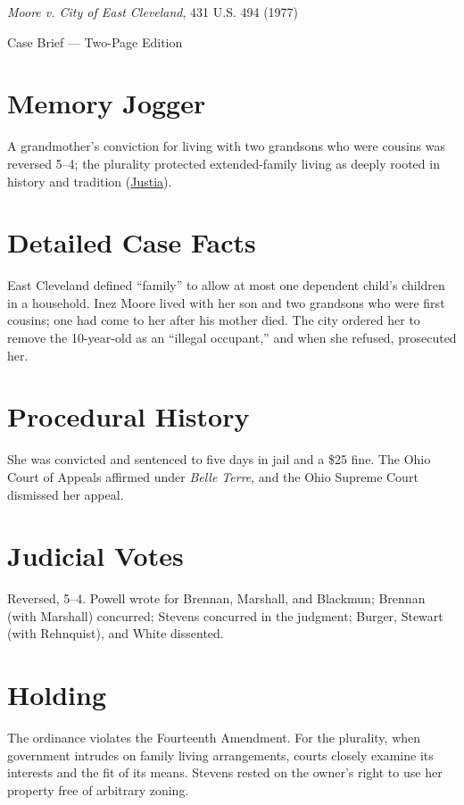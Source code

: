 \documentclass[12pt]{article}
\begin{document}
\begin{center}
{\LARGE \textit{Moore v. City of East Cleveland}, 431 U.S. 494 (1977)\par}
\vspace{0.5em}
{\large Case Brief --- Two-Page Edition\par}
\end{center}

\section{Memory Jogger}
A grandmother's conviction for living with two grandsons who were cousins was reversed 5--4; the plurality protected extended-family living as deeply rooted in history and tradition (\href{https://supreme.justia.com/cases/federal/us/431/494/}{Justia}).

\section{Detailed Case Facts}
East Cleveland defined ``family'' to allow at most one dependent child's children in a household. Inez Moore lived with her son and two grandsons who were first cousins; one had come to her after his mother died. The city ordered her to remove the 10-year-old as an ``illegal occupant,'' and when she refused, prosecuted her.

\section{Procedural History}
She was convicted and sentenced to five days in jail and a \$25 fine. The Ohio Court of Appeals affirmed under \textit{Belle Terre}, and the Ohio Supreme Court dismissed her appeal.

\section{Judicial Votes}
Reversed, 5--4. Powell wrote for Brennan, Marshall, and Blackmun; Brennan (with Marshall) concurred; Stevens concurred in the judgment; Burger, Stewart (with Rehnquist), and White dissented.

\section{Holding}
The ordinance violates the Fourteenth Amendment. For the plurality, when government intrudes on family living arrangements, courts closely examine its interests and the fit of its means. Stevens rested on the owner's right to use her property free of arbitrary zoning.
\end{document}
